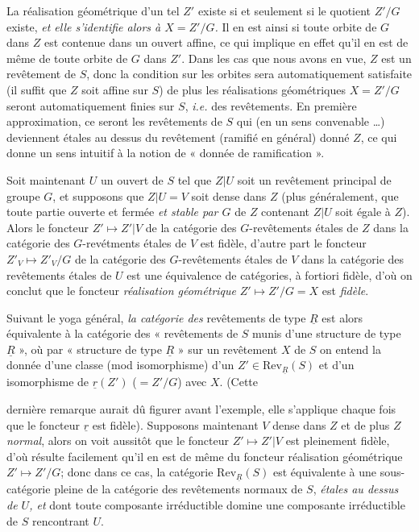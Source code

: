 \documentclass[11pt,a4paper]{article}
\begin{document}
La réalisation géométrique d'un tel $Z'$ existe si et seulement si le quotient
$Z'/G$ existe, \emph{et elle s'identifie alors à $X = Z'/G$.} Il en est ainsi
si toute orbite de $G$ dans $Z$ est contenue dans un ouvert affine, ce qui
implique en effet qu'il en est de même de toute orbite de $G$ dans $Z'$.
 Dans les cas que nous avons en
vue, $Z$ est un revêtement de $S$, donc la condition sur les orbites sera
automatiquement satisfaite (il suffit que $Z$ soit affine sur $S$)
\struck{\ill{}} de plus les réalisations géométriques $X = Z'/G$ seront
automatiquement finies sur $S$,  \emph{i.e.} des revêtements. En
première approximation, ce seront les revêtements de $S$ qui (en 
un sens convenable …) deviennent étales au dessus du revêtement (ramifié en
général) donné $Z$, ce qui donne un sens intuitif à la notion de « donnée de
ramification ».

Soit maintenant $U$ un ouvert de $S$ tel que $Z|U$ soit un revêtement principal
de groupe $G$, et supposons que $Z|U = V$ soit dense dans $Z$ (plus
généralement, que toute partie ouverte et fermée \emph{et stable par $G$} de
$Z$ contenant $Z|U$ soit égale à $Z$). Alors le foncteur $Z' \mapsto Z'|V$ de
la catégorie des $G$-revêtements étales de $Z$ dans la catégorie des
$G$-revétments étales de $V$ est fidèle, d'autre part le foncteur $Z'_V \mapsto
Z'_V/G$ de la catégorie des $G$-revêtements étales de $V$ dans la catégorie des
revêtements étales de $U$ est une équivalence de catégories, à fortiori fidèle,
d'où on conclut que le foncteur \emph{réalisation géométrique} $Z' \mapsto
Z'/G = X$ est \emph{fidèle}.

Suivant le yoga général, \struck{\ill{}} \emph{la catégorie des} revêtements de
type $\underline{R}$ est alors équivalente à la catégorie des « revêtements de
$S$ munis d'une structure de type $\underline{R}$ », où par « structure de type
$\underline{R}$ » sur un revêtement $X$ de $S$ on entend la donnée d'une classe
(mod isomorphisme) d'un $Z' \in \mathrm{Rev}_{\underline{R}}(S)$ et d'un
isomorphisme de $\underline{r}(Z')$ ($= Z'/G$) avec $X$. (Cette

dernière remarque aurait dû figurer avant l'exemple, elle s'applique chaque
fois que le foncteur $\underline{r}$ est fidèle). 
Supposons maintenant $V$ dense dans $Z$ et de plus $Z$ \emph{normal}, alors on
voit aussitôt que le foncteur $Z' \mapsto Z'|V$ est pleinement fidèle, d'où
résulte facilement qu'il en est de même du foncteur réalisation géométrique
$Z' \mapsto Z'/G$; donc dans ce cas, la catégorie $\mathrm{Rev}_{\underline{R}}(S)$
est équivalente à une sous-catégorie pleine de la catégorie des revêtements
normaux de $S$, \emph{étales au dessus de $U$, et} dont toute composante
irréductible domine une composante irréductible de $S$ rencontrant $U$.
\end{document}
